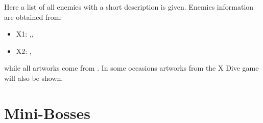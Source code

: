 Here a list of all enemies with a short description is given. Enemies information are obtained from: 
\begin{itemize}
	\item X1: \cite{wayback:X_resources},\cite{wiki:X1_enemies},
	\item X2: \cite{wayback:X2_resources},\cite{wiki:X2_enemies}
\end{itemize}
while all artworks come from \cite{book:MMX_Complete_art}. In some occasions artworks from the X Dive game will also  be shown.


\section{Mini-Bosses}
